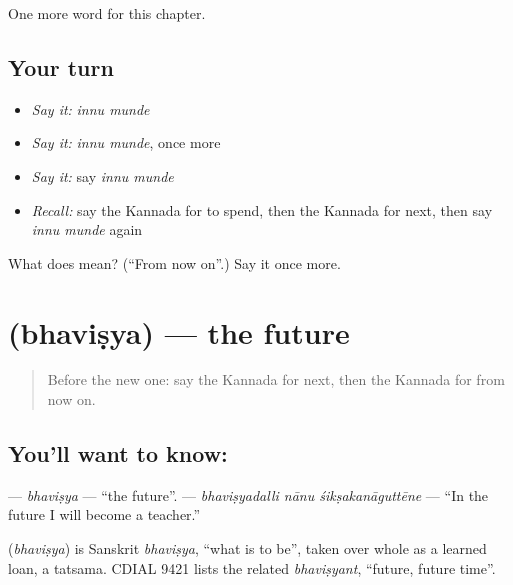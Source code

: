 \begin{grammarlens}[title={What you've built}]
One more word for this chapter.
\end{grammarlens}

\subsection*{Your turn}
\begin{itemize}
\raggedright
  \item \emph{Say it:} \emph{innu munde}
  \item \emph{Say it:} \emph{innu munde}, once more
  \item \emph{Say it:} say \emph{innu munde}
  \item \emph{Recall:} say the Kannada for to spend, then the Kannada for next, then say \emph{innu munde} again
\end{itemize}

\begin{tcolorbox}[breakable,colback=teal!4,colframe=teal!35!black,title={Before you move on}]
What does   mean? (\textquotedblleft{}From now on\textquotedblright{}.) Say it once more.
\end{tcolorbox}
\section[\texorpdfstring{\kn{ಭವಿಷ್ಯ} (bhaviṣya)}{ಭವಿಷ್ಯ (bhaviṣya)}]{ (bhaviṣya) — the future}

\label{lesson:KA-C156-bhavishya}



\begin{quote}
Before the new one: say the Kannada for next, then the Kannada for from now on.
\end{quote}

\subsection*{You'll want to know: }
\textbf{} — \emph{bhaviṣya} — \textquotedblleft{}the future\textquotedblright{}. \textbf{  } — \emph{bhaviṣyadalli nānu śikṣakanāguttēne} — \textquotedblleft{}In the future I will become a teacher.\textquotedblright{}

\begin{cousinweb}
\textbf{} (\emph{bhaviṣya}) is Sanskrit \emph{bhaviṣya}, \textquotedblleft{}what is to be\textquotedblright{}, taken over whole as a learned loan, a tatsama. CDIAL 9421 lists the related \emph{bhaviṣyant}, \textquotedblleft{}future, future time\textquotedblright{}.
\end{cousinweb}

